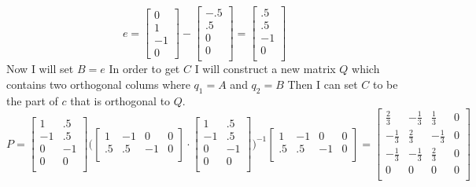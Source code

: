 \documentclass{article}
\begin{document}
\[
e
=
\begin{bmatrix}
0 \\
1 \\
-1 \\
0
\end{bmatrix}
-
\begin{bmatrix}
-.5 \\
.5 \\
0 \\
0 \\
\end{bmatrix}
=
\begin{bmatrix}
.5 \\
.5 \\
-1 \\
0 \\
\end{bmatrix}
\]
Now I will set $B = e$
\newline
In order to get $C$ I will construct a new matrix $Q$ which contains two orthogonal colums where $q_{1} = A$ and $q_{2} = B$
Then I can set $C$ to be the part of $c$ that is orthogonal to $Q$.
\[
P
=
\begin{bmatrix}
1 & .5 \\
-1 & .5 \\
0 & -1 \\
0 & 0\\
\end{bmatrix}
\Bigg(
\begin{bmatrix}
1 & -1 & 0 & 0 \\
.5 & .5 & -1 & 0 \\
\end{bmatrix}
\cdot
\begin{bmatrix}
1 & .5 \\
-1 & .5 \\
0 & -1 \\
0 & 0\\
\end{bmatrix}
\Bigg)^{-1}
\begin{bmatrix}
1 & -1 & 0 & 0 \\
.5 & .5 & -1 & 0 \\
\end{bmatrix}
=
\begin{bmatrix}
\frac{2}{3} & -\frac{1}{3} & \frac{1}{3} & 0 \\
-\frac{1}{3} & \frac{2}{3} & -\frac{1}{3} & 0 \\
-\frac{1}{3} & -\frac{1}{3} & \frac{2}{3} & 0 \\
0 & 0 & 0 & 0 \\
\end{bmatrix}
\]
\end{document}
